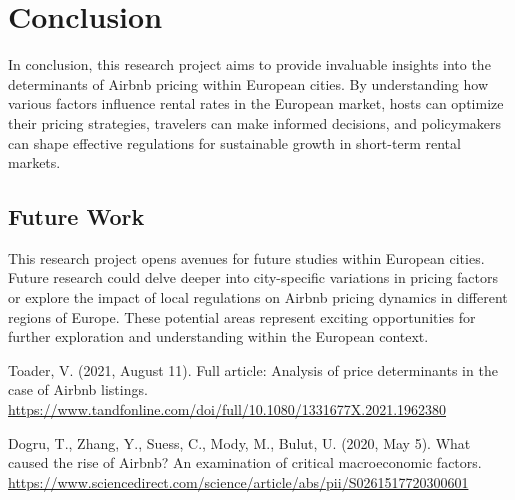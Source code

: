 \documentclass[12pt, letterpaper]{article}
\begin{document}
\section*{Conclusion}
In conclusion, this research project aims to provide invaluable insights into the determinants of Airbnb pricing within European cities. By understanding how various factors influence rental rates in the European market, hosts can optimize their pricing strategies, travelers can make informed decisions, and policymakers can shape effective regulations for sustainable growth in short-term rental markets.

\subsection*{Future Work}
This research project opens avenues for future studies within European cities. Future research could delve deeper into city-specific variations in pricing factors or explore the impact of local regulations on Airbnb pricing dynamics in different regions of Europe. These potential areas represent exciting opportunities for further exploration and understanding within the European context.

\begin{thebibliography}{}

Toader, V. (2021, August 11). Full article: Analysis of price determinants in the case of Airbnb listings.
\url{https://www.tandfonline.com/doi/full/10.1080/1331677X.2021.1962380} 

Dogru, T., Zhang, Y., Suess, C., Mody, M., Bulut, U. (2020, May 5).
What caused the rise of Airbnb? An examination of critical macroeconomic factors.
\url{https://www.sciencedirect.com/science/article/abs/pii/S0261517720300601} 

\end{thebibliography}
\end{document}
